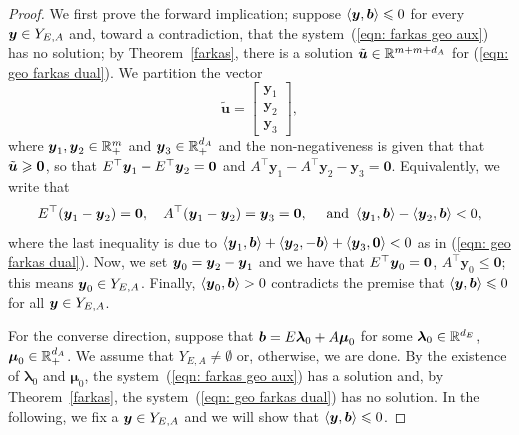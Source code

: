 \begin{proof}
We first prove the forward implication; suppose $\left\langle{\boldsymbol y}, {\boldsymbol b}\right\rangle \leqslant 0$ for every ${\boldsymbol y} \in Y_{E, A}$ and, toward a contradiction, that the system~(\ref{eqn: farkas geo aux}) has no solution; by Theorem~\ref{farkas}, there is a solution $\tilde{{\boldsymbol u}}\in\mathbb R^{m + m + d_A}$ for (\ref{eqn: geo farkas dual}). 
 We partition the vector 
\[\tilde{\bm u} = \begin{bmatrix}\bm y_1\\ \bm y_2\\ \bm y_3 \end{bmatrix}, \]
where ${\boldsymbol y}_1, {\boldsymbol y}_2\in\mathbb R^{m}_+$ and ${\boldsymbol y}_3 \in\mathbb R_+^{d_A}$ and the non-negativeness is given that that $\tilde{{\boldsymbol u}}\geqslant\boldsymbol0$, so that $E^\top {\boldsymbol y}_1 - E^\top {\boldsymbol y}_2 = \boldsymbol 0 $  and $A^\top\bm y_1 - A^\top\bm y_2 -  \bm y_3 = \bm 0$. Equivalently, we write that 
\[E^\top({\boldsymbol y}_1- {\boldsymbol y}_2) = \boldsymbol0, \quad A^\top({\boldsymbol y}_1 - {\boldsymbol y}_2) =  {\boldsymbol y}_3 =  \boldsymbol0, \quad \text{ and }\left\langle{\boldsymbol y}_1, \boldsymbol b\right\rangle - \left\langle{\boldsymbol y}_2, {\boldsymbol b}\right\rangle < 0, \]
where the last inequality is due to $\left\langle{\boldsymbol y}_1, {\boldsymbol b}\right\rangle + \left\langle{\boldsymbol y}_2, -{\boldsymbol b}\right\rangle + \left\langle{\boldsymbol y}_3, \boldsymbol0\right\rangle < 0$ as in (\ref{eqn: geo farkas dual}). Now, we set ${\boldsymbol y}_0 = {\boldsymbol y}_2 - {\boldsymbol y}_1$ and we have that $E^\top {\boldsymbol y}_0 = \boldsymbol 0$, $A^\top \bm y_0\leq \bm 0$; this means ${\boldsymbol y}_0\in Y_{E, A}$. Finally, $\left\langle{\boldsymbol y}_0, {\boldsymbol b}\right\rangle > 0$ contradicts the premise that $\left\langle{\boldsymbol y},{\boldsymbol b}\right\rangle\leqslant 0$ for all ${\boldsymbol y}\in Y_{E, A}$. 

For the converse direction, suppose that ${\boldsymbol b} = E\boldsymbol\lambda_0 + A \boldsymbol\mu_0$ for some $\boldsymbol\lambda_0\in\mathbb R^{d_E}$, $\boldsymbol\mu_0\in\mathbb R^{d_A}_+$. We assume that $Y_{E, A}\neq\emptyset$ or, otherwise, we are done. By the existence of $\bm\lambda_0$ and $\bm\mu_0$, the system~(\ref{eqn: farkas geo aux}) has a solution and, by Theorem~\ref{farkas}, the system~(\ref{eqn: geo farkas dual}) has no solution. In the following, we fix a ${\boldsymbol y}\in Y_{E, A}$ and we will show that $\left\langle{\boldsymbol y}, {\boldsymbol b}\right\rangle\leqslant 0$.


\end{proof}
